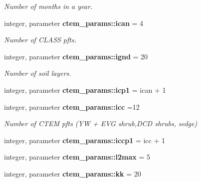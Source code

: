 \begin{DoxyCompactItemize}
\begin{DoxyCompactList}\small\item\em Number of months in a year. \end{DoxyCompactList}\item 
\hypertarget{namespacectem__params_af834d482b4eec80d530f6f6afc9fc5b5}{}integer, parameter {\bfseries ctem\+\_\+params\+::ican} = 4\label{namespacectem__params_af834d482b4eec80d530f6f6afc9fc5b5}

\begin{DoxyCompactList}\small\item\em Number of C\+L\+A\+S\+S pfts. \end{DoxyCompactList}\item 
\hypertarget{namespacectem__params_aa84174d70bc4dcedb2b6edeb859f1507}{}integer, parameter {\bfseries ctem\+\_\+params\+::ignd} = 20\label{namespacectem__params_aa84174d70bc4dcedb2b6edeb859f1507}

\begin{DoxyCompactList}\small\item\em Number of soil layers. \end{DoxyCompactList}\item 
\hypertarget{namespacectem__params_a8b61932a368c557cc3cb7edf6de23e22}{}integer, parameter {\bfseries ctem\+\_\+params\+::icp1} = ican + 1\label{namespacectem__params_a8b61932a368c557cc3cb7edf6de23e22}

\item 
\hypertarget{namespacectem__params_afa448c586accb0aa6dade1df419eb2fd}{}integer, parameter {\bfseries ctem\+\_\+params\+::icc} =12\label{namespacectem__params_afa448c586accb0aa6dade1df419eb2fd}

\begin{DoxyCompactList}\small\item\em Number of C\+T\+E\+M pfts (Y\+W + E\+V\+G shrub,D\+C\+D shrubs, sedge) \end{DoxyCompactList}\item 
\hypertarget{namespacectem__params_a1da4b2c80e21cf1adf10e9c7ee9a2189}{}integer, parameter {\bfseries ctem\+\_\+params\+::iccp1} = icc + 1\label{namespacectem__params_a1da4b2c80e21cf1adf10e9c7ee9a2189}

\item 
\hypertarget{namespacectem__params_af57395876febe85e76b0403ab6a4e8ed}{}integer, parameter {\bfseries ctem\+\_\+params\+::l2max} = 5\label{namespacectem__params_af57395876febe85e76b0403ab6a4e8ed}

\item 
\hypertarget{namespacectem__params_a4b2eab1c298364048680641681921e56}{}integer, parameter {\bfseries ctem\+\_\+params\+::kk} = 20\label{namespacectem__params_a4b2eab1c298364048680641681921e56}


\end{DoxyCompactItemize}
